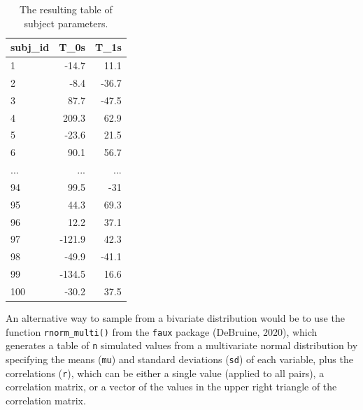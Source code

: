 \documentclass[english,doc,floatsintext]{apa6}
\begin{document}
\begin{table}[H]

\begin{center}
\begin{threeparttable}

\caption{\label{tab:subj-table}The resulting table of subject parameters.}

\begin{tabular}{lrr}
\toprule
subj\_id & \multicolumn{1}{c}{T\_0s} & \multicolumn{1}{c}{T\_1s}\\
\midrule
1 & -14.7 & 11.1\\
2 & -8.4 & -36.7\\
3 & 87.7 & -47.5\\
4 & 209.3 & 62.9\\
5 & -23.6 & 21.5\\
6 & 90.1 & 56.7\\
... & ... & ...\\
94 & 99.5 & -31\\
95 & 44.3 & 69.3\\
96 & 12.2 & 37.1\\
97 & -121.9 & 42.3\\
98 & -49.9 & -41.1\\
99 & -134.5 & 16.6\\
100 & -30.2 & 37.5\\
\bottomrule
\end{tabular}

\end{threeparttable}
\end{center}

\end{table}

An alternative way to sample from a bivariate distribution would be to use the function \texttt{rnorm\_multi()} from the \texttt{faux} package (DeBruine, 2020), which generates a table of \texttt{n} simulated values from a multivariate normal distribution by specifying the means (\texttt{mu}) and standard deviations (\texttt{sd}) of each variable, plus the correlations (\texttt{r}), which can be either a single value (applied to all pairs), a correlation matrix, or a vector of the values in the upper right triangle of the correlation matrix.
\end{document}

